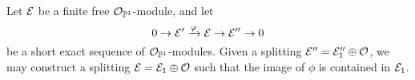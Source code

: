 






\begin{lemma} \label{mini-splitting-lemma}
	Let $\mathcal{E}$ be a finite free $\mathcal{O}_{\mathbb{P}^1}$-module, and let 
	\[
		0 \to \mathcal{E}' \xrightarrow{\varphi} \mathcal{E} \to \mathcal{E}'' \to 0
 	\]
 	be a short exact sequence of $\mathcal{O}_{\mathbb{P}^1}$-modules. Given a splitting $\mathcal{E}'' = \mathcal{E}''_1 \oplus \mathcal{O}$, we may construct a splitting $\mathcal{E} = \mathcal{E}_1 \oplus \mathcal{O}$ such that the image of $\phi$ is contained in $\mathcal{E}_1$.
\end{lemma}

